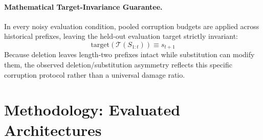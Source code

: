 \documentclass[11pt]{article}
\begin{document}
\paragraph{Mathematical Target-Invariance Guarantee.} In every noisy evaluation condition, pooled corruption budgets are applied across historical prefixes, leaving the held-out evaluation target strictly invariant:
\begin{equation}
  \text{target}(\mathcal{T}(S_{1:t})) \equiv s_{t+1}
\end{equation}
Because deletion leaves length-two prefixes intact while substitution can modify them, the observed deletion/substitution asymmetry reflects this specific corruption protocol rather than a universal damage ratio.

\section{Methodology: Evaluated Architectures}\label{sec:method}

\begin{table}[t]
  \centering
  \small
  \caption{Clean baseline evaluation across Diginetica and RetailRocket (Seed 2028). Published SR-GNN values are from \citet{wu2019session}, which reports P@20; with one held-out target per example, P@20 is equivalent to the single-target Recall@20 used here.}
  \label{tab:reproduction}
\end{table}
\end{document}
